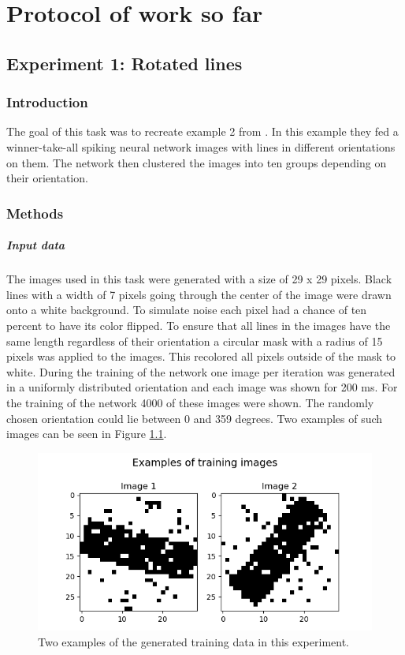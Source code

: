 \chapter{Protocol of work so far}
\section{Experiment 1: Rotated lines}
\label{section:rotatedLines}
\subsection{Introduction}
The goal of this task was to recreate example 2 from \citet{nessler}. In this example they fed a winner-take-all spiking neural network images with lines in different orientations on them. The network then clustered the images into ten groups depending on their orientation.

\subsection{Methods}
\paragraph{Input data}
The images used in this task were generated with a size of 29 x 29 pixels. Black lines with a width of 7 pixels going through the center of the image were drawn onto a white background. To simulate noise each pixel had a chance of ten percent to have its color flipped. To ensure that all lines in the images have the same length regardless of their orientation a circular mask with a radius of 15 pixels was applied to the images. This recolored all pixels outside of the mask to white. During the training of the network one image per iteration was generated in a uniformly distributed orientation and each image was shown for 200 ms. For the training of the network 4000 of these images were shown. The randomly chosen orientation could lie between 0 and 359 degrees.  Two examples of such images can be seen in Figure \ref{fig:angleImages}.

\begin{figure}
  \includegraphics[width=\linewidth]{figures/angleNetwork/trainingImages.png}
  \caption{Two examples of the generated training data in this experiment.}
  \label{fig:angleImages}
\end{figure}

